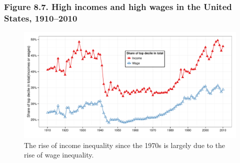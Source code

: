 \documentclass[t]{beamer}\usepackage[]{graphicx}\usepackage[]{color}
\newenvironment{knitrout}{}{} %
\begin{document}
\begin{frame}[label=Figure_8_7,fragile]
\frametitle{Figure 8.7. High incomes and high wages in the United States, 1910--2010}
\begin{figure}[t]
\begin{minipage}[b]{\textwidth}
\centering
\begin{knitrout}\footnotesize
{}\color{fgcolor}

{\centering \includegraphics[width=1\linewidth]{figures/color/Figure_8_7} 

}



\end{knitrout}
\caption{The rise of income inequality since the 1970s is largely due to the rise of wage inequality.}
\end{minipage}
\end{figure}
\end{frame}
\end{document}
